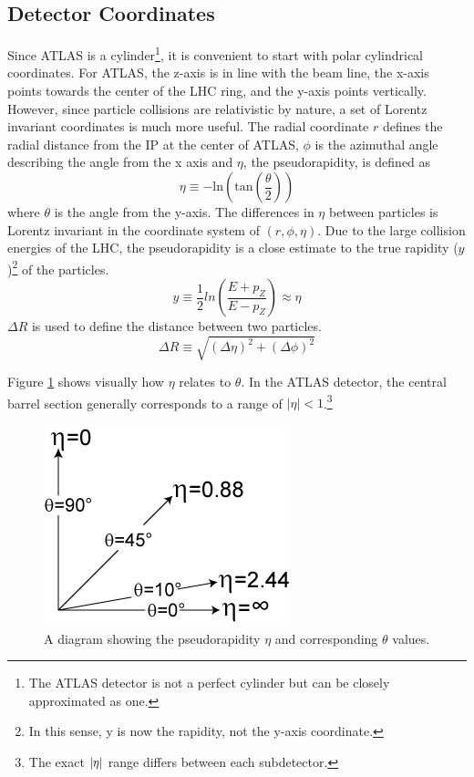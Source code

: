 	\subsection{Detector Coordinates}\label{ssec:coordinates}
		Since \gls{ATLAS} is a cylinder\footnote{The \gls{ATLAS} detector is not a perfect cylinder but can be closely approximated as one.}, it is convenient to start with polar cylindrical coordinates. For \gls{ATLAS}, the z-axis is in line with the beam line, the x-axis points towards the center of the \gls{LHC} ring, and the y-axis points vertically. However, since particle collisions are relativistic by nature, a set of Lorentz invariant coordinates is much more useful. The radial coordinate $r$ defines the radial distance from the \gls{IP} at the center of \gls{ATLAS}, $\phi$ is the azimuthal angle describing the angle from the x axis and $\eta$, the pseudorapidity, is defined as 
		\begin{equation}\label{eqn:eta}
		\eta \equiv - \mathrm{ln} \left( \mathrm{tan} \left( \frac{\theta}{2} \right) \right)
		\end{equation}
		where $\theta$ is the angle from the y-axis. The differences in $\eta$ between particles is Lorentz invariant in the coordinate system of $(r,\phi,\eta)$. Due to the large collision energies of the \gls{LHC}, the pseudorapidity is a close estimate to the true rapidity ($y$)\footnote{In this sense, y is now the rapidity, not the y-axis coordinate.} of the particles. 
		\begin{equation}\label{eqn:rapidity}
		y \equiv \frac{1}{2} ln(\frac{E+p_Z}{E-p_Z}) \approx \eta
		\end{equation}
		$\Delta R$ is used to define the distance between two particles.
		\begin{equation}\label{eqn:dR}
		\Delta R \equiv \sqrt{ (\Delta \eta)^2 + (\Delta \phi)^2}
		\end{equation}

		Figure \ref{fig:pseudorapidity} shows visually how $\eta$ relates to $\theta$. In the \gls{ATLAS} detector, the central barrel section generally corresponds to a range of $|\eta|<1$.\footnote{The exact $|{\eta}|$ range differs between each subdetector.} 

		\begin{figure}[!ht]
		\centering
		\includegraphics[width=.25\textwidth,keepaspectratio=true]{chapters/chapter3_experiment/images/Pseudorapidity.png}
		\caption{ A diagram showing the pseudorapidity $\eta$ and corresponding $\theta$ values. \cite{pseudorapidity} }
		\label{fig:pseudorapidity}
		\end{figure}

